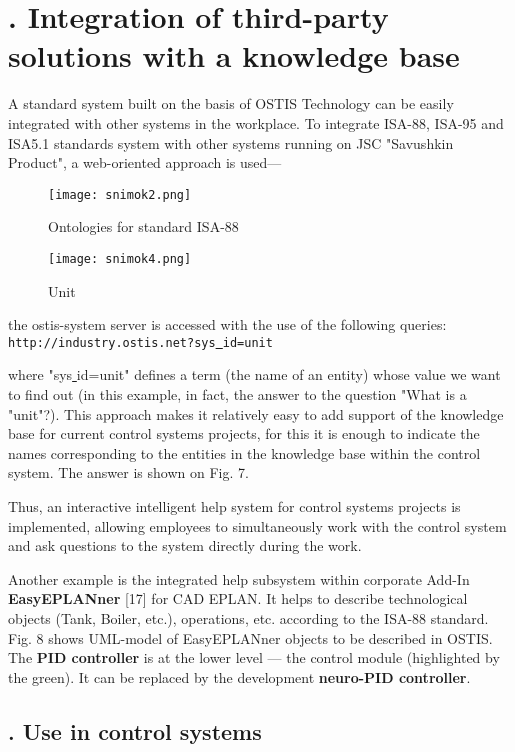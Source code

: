 \documentclass[7pt]{article} \twocolumn
\newcommand{\RomanNumeralCaps}[1]
{\MakeUppercase{\romannumeral #1}} %
\begin{document}
\section*{\footnotesize \centering \RomanNumeralCaps{6}. Integration of third-party solutions with a \newline knowledge base}
\vspace{0.1cm}
A standard system built on the basis of OSTIS Technology can be easily integrated with other systems in
the workplace. To integrate ISA-88, ISA-95 and ISA5.1 standards system with other systems running on JSC
"Savushkin Product", a web-oriented approach is used—
\begin{figure}
    \centering
    \texttt{[image: snimok2.png]}
    \caption{Ontologies for standard ISA-88}
\end{figure}
\begin{figure}
    \centering
    \texttt{[image: snimok4.png]}
    \caption{Unit}
\end{figure}
the ostis-system server is accessed with the use of the
following queries: \newline
\texttt{http://industry.ostis.net?sys\underline{ }id=unit} \par
where "sys\underline{ }id=unit" defines a term (the name of an
entity) whose value we want to find out (in this example,
in fact, the answer to the question "What is a "unit"?).
This approach makes it relatively easy to add support of
the knowledge base for current control systems projects,
for this it is enough to indicate the names corresponding
to the entities in the knowledge base within the control
system. The answer is shown on Fig. 7. \par
Thus, an interactive intelligent help system for control
systems projects is implemented, allowing employees to
simultaneously work with the control system and ask
questions to the system directly during the work. \par
Another example is the integrated help subsystem
within corporate Add-In \textbf{EasyEPLANner} [17] for CAD
EPLAN. It helps to describe technological objects (Tank,
Boiler, etc.), operations, etc. according to the ISA-88
standard. Fig. 8 shows UML-model of EasyEPLANner
objects to be described in OSTIS. The \textbf{PID controller}
is at the lower level — the control module (highlighted
by the green). It can be replaced by the development
\textbf{neuro-PID controller}.
\begin{center}
    \section*{\footnotesize \RomanNumeralCaps{7}. Use in control systems}
\end{center} \par
\end{document}
